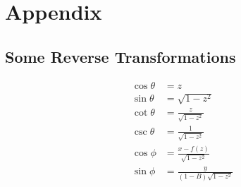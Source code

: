 \documentclass[a4paper,11pt]{scrartcl}
\begin{document}
\section{Appendix}
\subsection{Some Reverse Transformations}
\begin{align}
  \cos\theta &= z\\
  \sin\theta &= \sqrt{1-z^{2}}\\
  \cot\theta &= \frac{z}{ \sqrt{1-z^{2}}}\\
  \csc\theta &= \frac{1}{ \sqrt{1-z^{2}}}\\
  \cos\phi  &= \frac{x-f(z)}{\sqrt{1-z^{2}}}\\
  \sin\phi &= \frac{y}{(1-B)\sqrt{1-z^{2}}}\\
\end{align}
\end{document}
